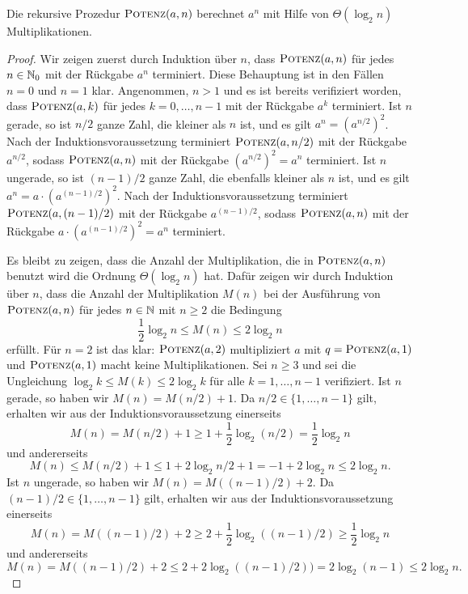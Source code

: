 \begin{prop}
	Die rekursive Prozedur $\mathop{\text{\textsc{Potenz}}}(a,n)$ berechnet $a^n$ mit Hilfe von $\Theta(\log_2 n)$ Multiplikationen.
\end{prop} 
\begin{proof} 
	Wir zeigen zuerst durch Induktion über $n$, dass $\mathop{\text{\textsc{Potenz}}}(a,n)$ für jedes $n \in \mathbb{N}_0$ mit der Rückgabe $a^n$ terminiert. 
	Diese Behauptung ist in den Fällen $n=0$ und $n=1$ klar. Angenommen, $n>1$ und es ist bereits verifiziert worden, dass $\mathop{\text{\textsc{Potenz}}}(a,k)$ für jedes $k=0,\ldots,n-1$ mit der Rückgabe $a^k$ terminiert. Ist $n$ gerade, so ist $n/2$ ganze Zahl, die kleiner als $n$ ist, und es gilt $a^n = (a^{n/2})^2$. Nach der Induktionsvoraussetzung terminiert $\mathop{\text{\textsc{Potenz}}}(a,n/2)$ mit der Rückgabe $a^{n/2}$, sodass $\mathop{\text{\textsc{Potenz}}}(a,n)$ mit der Rückgabe $(a^{n/2})^2 = a^n$ terminiert. Ist $n$ ungerade, so ist $(n-1)/2$ ganze Zahl, die ebenfalls kleiner als $n$ ist, und es gilt $a^n = a \cdot (a^{(n-1)/2})^2$. Nach der Induktionsvoraussetzung terminiert $\mathop{\text{\textsc{Potenz}}}(a,(n-1)/2)$ mit der Rückgabe $a^{(n-1)/2}$, sodass $\mathop{\text{\textsc{Potenz}}}(a,n)$ mit der Rückgabe $a \cdot (a^{(n-1)/2})^2 = a^n$ terminiert. 
	
	Es bleibt zu zeigen, dass die Anzahl der Multiplikation, die in $\mathop{\text{\textsc{Potenz}}}(a,n)$ benutzt wird die Ordnung $\Theta(\log_2 n)$ hat. Dafür zeigen wir durch Induktion über $n$, dass die Anzahl der Multiplikation $M(n)$ bei der Ausführung von $\mathop{\text{\textsc{Potenz}}}(a,n)$ für jedes $n \in \mathbb{N}$ mit $n \ge 2$ 
	die Bedingung
	\[
			 \frac{1}{2} \log_2 n \le M(n) \le  2 \log_2 n
	\]
	erfüllt. Für $n=2$ ist das klar: $\mathop{\text{\textsc{Potenz}}}(a,2)$ multipliziert $a$ mit $q = \mathop{\text{\textsc{Potenz}}}(a,1)$ und $\mathop{\text{\textsc{Potenz}}}(a,1)$ macht keine Multiplikationen. Sei $n \ge 3$ und sei die Ungleichung $\log_2 k \le M(k) \le 2 \log_2 k$ für alle $k=1,\ldots,n-1$ verifiziert. Ist $n$ gerade, so haben wir $M(n) = M(n/2)+ 1$. Da $n/2 \in \{1,\ldots,n-1\}$ gilt, erhalten wir aus der Induktionsvoraussetzung einerseits
	\[
			M(n) = M(n/2) + 1 \ge 1 + \frac{1}{2} \log_2 (n/2) = \frac{1}{2} \log_2 n
	\]
	und andererseits 
	\[
		M(n) \le M(n/2) + 1 \le 1 + 2 \log_2 n/2 + 1 = -1 +  2 \log_2 n \le  2 \log_2 n. 
	\]
	Ist $n$ ungerade, so haben wir $M(n) = M((n-1)/2) + 2$. Da $(n-1)/2 \in \{1,\ldots,n-1\}$ gilt, erhalten wir aus der Induktionsvoraussetzung einerseits 
	\[
		M(n) = M((n-1)/2) + 2 \ge 2 + \frac{1}{2} \log_2 ((n-1)/2) \ge \frac{1}{2} \log_2 n
	\]
	und andererseits 
	\[
		M(n) = M((n-1)/2)+2 \le 2 + 2 \log_2 ((n-1)/2))  = 2 \log_2 (n-1) \le 2 \log_2 n. 
	\]
\end{proof} 


